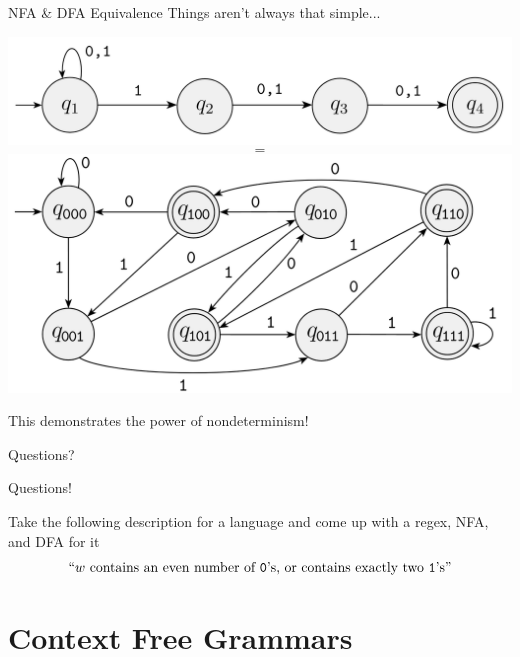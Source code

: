 \documentclass[aspectratio=169]{beamer}
\begin{document}
\begin{frame}{NFA \& DFA Equivalence}
    Things aren't always that simple... \pause
    \begin{center}
    \includegraphics[scale=0.15]{N2.png} \pause
    {\Large $$=$$}
    \includegraphics[scale=0.15]{N2_DFA.png}
    \end{center}
    This demonstrates the power of nondeterminism!
\end{frame}


\begin{frame}{}
      \begin{center}
    {\color{sigma@mainblue} \LARGE Questions?}
  \end{center}
\end{frame}

\begin{frame}{Questions!}
    
    Take the following description for a language and come up with a regex, NFA, and DFA for it
    $$
    ``w \textrm{ contains an even number of } \texttt{0} \textrm{'s, or contains exactly two } \texttt{1} \textrm{'s}"
    $$
    
\end{frame}

\section{Context Free Grammars}
\frame{\sectionpage}
\end{document}
